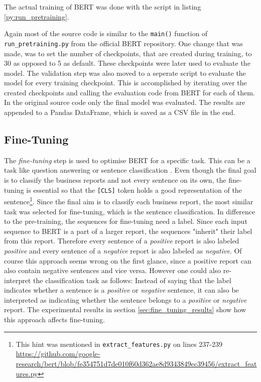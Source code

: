 The actual training of \ac{BERT} was done with the script in listing \ref{py:run_pretraining}.

Again most of the source code is similar to the \texttt{main()} function of \texttt{run\_pretraining.py} from the official \ac{BERT} repository.
One change that was made, was to set the number of checkpoints, that are created during training, to 30 as opposed to 5 as default.
These checkpoints were later used to evaluate the model.
The validation step was also moved to a seperate script to evaluate the model for every training checkpoint.
This is accomplished by iterating over the created checkpoints and calling the evaluation code from \ac{BERT} for each of them.
In the original source code only the final model was evaluated.
The results are appended to a Pandas DataFrame, which is saved as a \ac{CSV} file in the end.

\subsection{Fine-Tuning}
\label{subsec:fine_tuning}
The \textit{fine-tuning} step is used to optimise \ac{BERT} for a specific task.
This can be a task like question answering or sentence classification \cite[pp. 5-7]{Devlin2018}.
Even though the final goal is to classify the business reports and not every sentence on its own, the fine-tuning is essential so that the \texttt{[CLS]} token holds a good representation of the sentence\footnote{This hint was mentioned in \texttt{extract\_features.py} on lines 237-239 \url{https://github.com/google-research/bert/blob/fe354751d7de010f60d362ae8d9343849ec39456/extract_features.py}}.
Since the final aim is to classify each business report, the most similar task was selected for fine-tuning, which is the sentence classification.
In difference to the pre-training, the sequences for fine-tuning need a label.
Since each input sequence to \ac{BERT} is a part of a larger report, the sequences "inherit" their label from this report.
Therefore every sentence of a \textit{positive} report is also labeled \textit{positive} and every sentence of a \textit{negative} report is also labeled as \textit{negative}.
Of course this approach seems wrong on the first glance, since a positive report can also contain negative sentences and vice versa.
However one could also re-interpret the classification task as follows:
Instead of saying that the label indicates whether a sentence is a \textit{positive} or \textit{negative} sentence, it can also be interpreted as indicating whether the sentence belongs to a \textit{positive} or \textit{negative} report.
The experimental results in section \ref{sec:fine_tuning_results} show how this approach affects fine-tuning.

